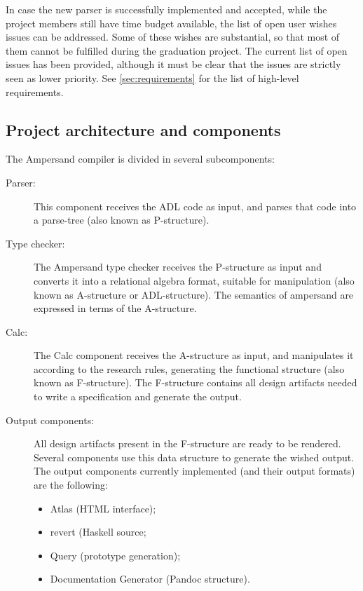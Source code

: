 In case the new parser is successfully implemented and accepted, while the project members still have time budget available, the list of open user wishes issues can be addressed.
Some of these wishes are substantial, so that most of them cannot be fulfilled during the graduation project.
The current list of open issues has been provided\cite{open-issues}, although it must be clear that the issues are strictly seen as lower priority.
See \autoref{sec:requirements} for the list of high-level requirements.

\subsection{Project architecture and components}
\label{subsec:architecture}
The Ampersand compiler is divided in several subcomponents:
%
%
%
%
\begin{description}
	\item[Parser:] This component receives the ADL code as input, and parses that code into a parse-tree (also known as P-structure).
	\item[Type checker:] The Ampersand type checker receives the P-structure as input and converts it into a relational algebra format, suitable for manipulation (also known as A-structure or ADL-structure).
		 The semantics of ampersand are expressed in terms of the A-structure.
	\item[Calc:] The Calc component receives the A-structure as input, and manipulates it according to the research rules, generating the functional structure (also known as F-structure).
		The F-structure contains all design artifacts needed to write a specification and generate the output.
	\item[Output components:] All design artifacts present in the F-structure are ready to be rendered.
		Several components use this data structure to generate the wished output.
		The output components currently implemented (and their output formats) are the following: 
		\begin{itemize}
			\item Atlas (HTML interface);
			\item revert (Haskell source;
			\item  Query (prototype generation);
			\item  Documentation Generator (Pandoc structure).
		\end{itemize}
\end{description}
